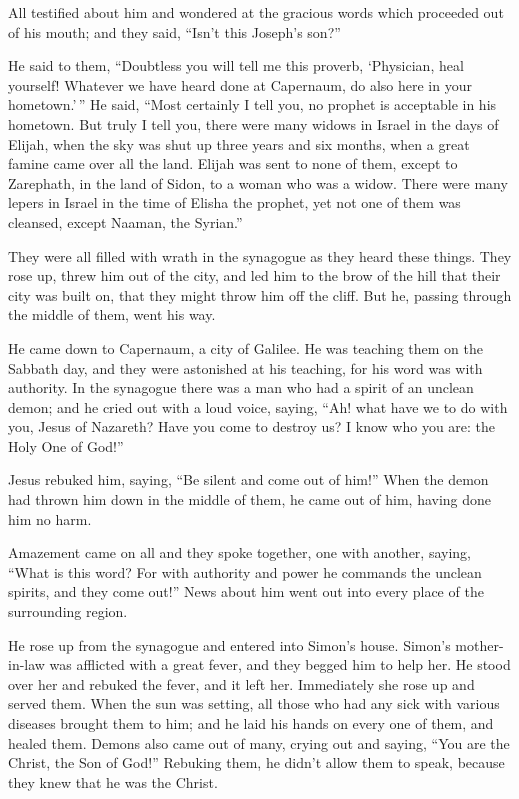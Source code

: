  All testified about him and wondered at the gracious
words which proceeded out of his mouth; and they said, ``Isn't this
Joseph's son?''

 He said to them, ``Doubtless you will tell me this
proverb, `Physician, heal yourself! Whatever we have heard done at
Capernaum, do also here in your hometown.'\,''  He said,
``Most certainly I tell you, no prophet is acceptable in his hometown.
 But truly I tell you, there were many widows in Israel
in the days of Elijah, when the sky was shut up three years and six
months, when a great famine came over all the land. 
Elijah was sent to none of them, except to Zarephath, in the land of
Sidon, to a woman who was a widow.  There were many
lepers in Israel in the time of Elisha the prophet, yet not one of them
was cleansed, except Naaman, the Syrian.''

 They were all filled with wrath in the synagogue as they
heard these things.  They rose up, threw him out of the
city, and led him to the brow of the hill that their city was built on,
that they might throw him off the cliff.  But he, passing
through the middle of them, went his way.

 He came down to Capernaum, a city of Galilee. He was
teaching them on the Sabbath day,  and they were
astonished at his teaching, for his word was with authority.
 In the synagogue there was a man who had a spirit of an
unclean demon; and he cried out with a loud voice, 
saying, ``Ah! what have we to do with you, Jesus of Nazareth? Have you
come to destroy us? I know who you are: the Holy One of God!''

 Jesus rebuked him, saying, ``Be silent and come out of
him!'' When the demon had thrown him down in the middle of them, he came
out of him, having done him no harm.

 Amazement came on all and they spoke together, one with
another, saying, ``What is this word? For with authority and power he
commands the unclean spirits, and they come out!''  News
about him went out into every place of the surrounding region.

 He rose up from the synagogue and entered into Simon's
house. Simon's mother-in-law was afflicted with a great fever, and they
begged him to help her.  He stood over her and rebuked
the fever, and it left her. Immediately she rose up and served them.
 When the sun was setting, all those who had any sick
with various diseases brought them to him; and he laid his hands on
every one of them, and healed them.  Demons also came out
of many, crying out and saying, ``You are the Christ, the Son of God!''
Rebuking them, he didn't allow them to speak, because they knew that he
was the Christ.

